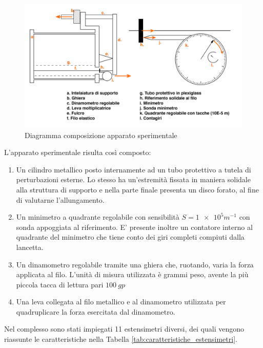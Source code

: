 \documentclass[a4paper,11pt,oneside]{article}
\begin{document}
\begin{figure}[h!]
    \centering
    \includegraphics[width=12.5cm]{ApparatoSperimentale.jpg}
    \caption{Diagramma composizione apparato sperimentale}
    \label{fig:apparato_sperimentale}
\end{figure}
L'apparato sperimentale risulta così composto:
\begin{enumerate}
    \item Un cilindro metallico posto internamente ad un tubo protettivo a tutela di perturbazioni esterne. Lo stesso ha un'estremità fissata in maniera solidale alla struttura di supporto e nella parte finale presenta un disco forato, al fine di valutarne l'allungamento.
    \item Un minimetro a quadrante regolabile con sensibilità $S=\num{1e5} \si{m^{-1}}$ con sonda appoggiata al riferimento. E' presente inoltre un contatore interno al quadrante del minimetro che tiene conto dei giri completi compiuti dalla lancetta.
    \item Un dinamometro regolabile tramite una ghiera che, ruotando, varia la forza applicata al filo. L'unità di misura utilizzata è grammi peso, avente la più piccola tacca di lettura pari $\SI{100}{gp}$
    \item Una leva collegata al filo metallico e al dinamometro utilizzata per quadruplicare la forza esercitata dal dinamometro.
\end{enumerate}
Nel complesso sono stati impiegati 11 estensimetri diversi, dei quali vengono riassunte le caratteristiche nella Tabella \ref{tab:caratteristiche_estensimetri}.
\end{document}

